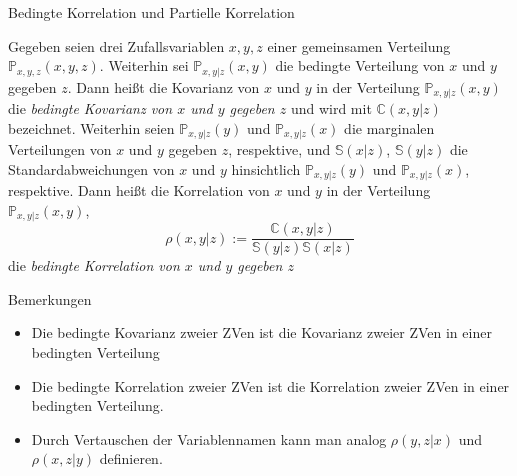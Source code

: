 \documentclass[
  8pt,
  ignorenonframetext,
]{beamer}
\providecommand{\tightlist}{%
  \setlength{\itemsep}{0pt}\setlength{\parskip}{0pt}}
\begin{document}
\begin{frame}{Bedingte Korrelation und Partielle Korrelation}
\protect\hypertarget{bedingte-korrelation-und-partielle-korrelation-2}{}
\footnotesize
\begin{definition}
\justifying
Gegeben seien drei Zufallsvariablen $x,y,z$ einer gemeinsamen Verteilung
$\mathbb{P}_{x,y,z}(x,y,z)$.  Weiterhin sei $\mathbb{P}_{x,y |z}(x,y)$ 
die bedingte Verteilung von $x$ und $y$ gegeben $z$. Dann heißt
die Kovarianz von $x$ und $y$ in der Verteilung $\mathbb{P}_{x,y|z}(x,y)$
die \textit{bedingte Kovarianz von $x$ und $y$ gegeben $z$} und
wird mit $\mathbb{C}(x,y|z)$ bezeichnet. Weiterhin seien $\mathbb{P}_{x,y|z}(y)$ und 
$\mathbb{P}_{x,y|z}(x)$ die marginalen Verteilungen von $x$ und $y$ gegeben $z$, 
respektive, und $\mathbb{S}(x|z)$, $\mathbb{S}(y|z)$
die Standardabweichungen von $x$ und $y$ hinsichtlich
$\mathbb{P}_{x,y|z}(y)$  und $\mathbb{P}_{x,y|z}(x)$, respektive. 
Dann heißt die Korrelation von $x$ und $y$ in der Verteilung $\mathbb{P}_{x,y|z}(x,y)$,
\begin{equation}
\rho(x,y|z) := \frac{\mathbb{C}(x,y|z)}{\mathbb{S}(y  |z)\mathbb{S}(x|z)}
\end{equation}
die \textit{bedingte Korrelation von $x$ und $y$ gegeben $z$}
\end{definition}

Bemerkungen

\begin{itemize}
\tightlist
\item
  Die bedingte Kovarianz zweier ZVen ist die Kovarianz zweier ZVen in
  einer bedingten Verteilung
\item
  Die bedingte Korrelation zweier ZVen ist die Korrelation zweier ZVen
  in einer bedingten Verteilung.
\item
  Durch Vertauschen der Variablennamen kann man analog \(\rho(y,z|x)\)
  und \(\rho(x,z|y)\) definieren.
\end{itemize}
\end{frame}
\end{document}
